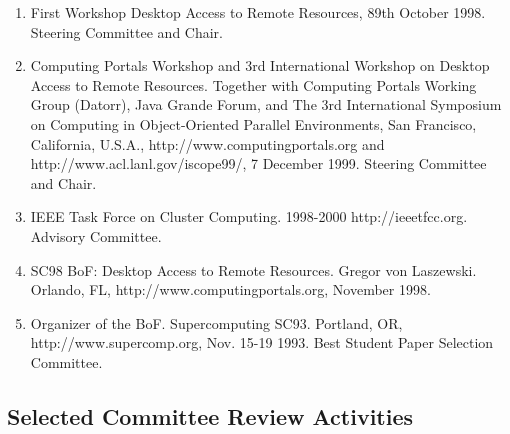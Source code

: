 \documentclass{article}
\begin{document}
\begin{enumerate}
\item  First Workshop Desktop Access to Remote Resources, 89th October 1998. Steering Committee and Chair. 
\item  Computing Portals Workshop and 3rd International Workshop on Desktop Access to Remote Resources. Together with Computing Portals Working Group (Datorr), Java Grande Forum, and The 3rd International Symposium on Computing in Object-Oriented Parallel Environments, San Francisco, California, U.S.A., http://www.computingportals.org and http://www.acl.lanl.gov/iscope99/, 7 December 1999. Steering Committee and Chair. 
\item  IEEE Task Force on Cluster Computing. 1998-2000 http://ieeetfcc.org. Advisory Committee. 
\item  SC98 BoF: Desktop Access to Remote Resources.  Gregor von Laszewski. Orlando, FL, http://www.computingportals.org, November 1998. 
\item  Organizer of the BoF. Supercomputing  SC93. Portland, OR, http://www.supercomp.org, Nov. 15-19 1993. Best Student Paper Selection Committee. 
\end{enumerate}
 
\subsection{Selected Committee Review Activities}
\end{document}
